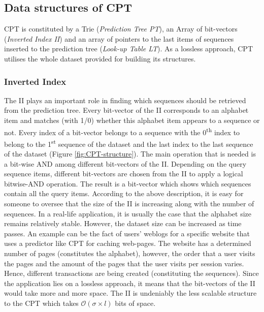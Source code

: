\subsection{Data structures of CPT}

CPT is constituted by a Trie (\emph{Prediction Tree PT}), an Array of bit-vectors (\emph{Inverted Index II}) and an array of pointers to the last items of sequences inserted to the prediction tree (\emph{Look-up Table LT}). As a lossless approach, CPT utilises the whole dataset provided for building its structures.

\subsubsection*{Inverted Index}
The II plays an important role in finding which sequences should be retrieved from the prediction tree. Every bit-vector of the II corresponds to an alphabet item and matches (with 1/0) whether this alphabet item appears to a sequence or not. Every index of a bit-vector belongs to a sequence with the 0\textsuperscript{th} index to belong to the 1\textsuperscript{st} sequence of the dataset and the last index to the last sequence of the dataset (Figure \ref{fig:CPT-structure}). The main operation that is needed is a bit-wise AND among different bit-vectors of the II. Depending on the query sequence items, different bit-vectors are chosen from the II to apply a logical bitwise-AND operation. The result is a bit-vector which shows which sequences contain all the query items. According to the above description, it is easy for someone to oversee that the size of the II is increasing along with the number of sequences. In a real-life application, it is usually the case that the alphabet size remains relatively stable. However, the dataset size can be increased as time passes. An example can be the fact of users' weblogs for a specific website that uses a predictor like CPT for caching web-pages. The website has a determined number of pages (constitutes the alphabet), however, the order that a user visits the pages and the amount of the pages that the user visits per session varies. Hence, different transactions are being created (constituting the sequences). Since the application lies on a lossless approach, it means that the bit-vectors of the II would take more and more space. The II is undeniably the less scalable structure to the CPT which takes \(\mathcal{O}(\sigma \times l)\) bits of space.

